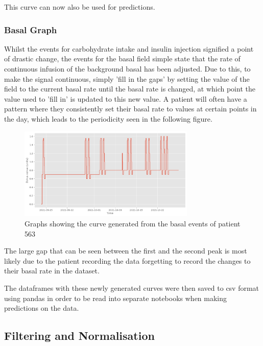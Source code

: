           This curve can now also be used for predictions.

          \subsubsection{Basal Graph}

          Whilst the events for carbohydrate intake and insulin injection signified a point of drastic change, the events for the basal field simple state that the rate of continuous infusion of the background basal has been adjusted. Due to this, to make the signal continuous, simply 'fill in the gaps' by setting the value of the field to the current basal rate until the basal rate is changed, at which point the value used to 'fill in' is updated to this new value. A patient will often have a pattern where they consistently set their basal rate to values at certain points in the day, which leads to the periodicity seen in the following figure.

          \begin{figure}[H]
            \centering
            \includegraphics[width=0.75\textwidth]{images/BasalLG.png} 
            \caption{
             Graphs showing the curve generated from the basal events of patient 563
            }
          \end{figure}

          The large gap that can be seen between the first and the second peak is most likely due to the patient recording the data forgetting to record the changes to their basal rate in the dataset.

          The dataframes with these newly generated curves were then saved to csv format using pandas in order to be read into separate notebooks when making predictions on the data.

      \subsection{Filtering and Normalisation}
                   
